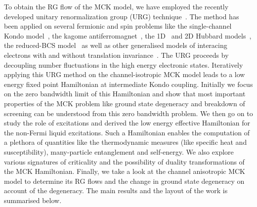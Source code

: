 \documentclass[reprint,prb,superscriptaddress]{revtex4-2}
\begin{document}
To obtain the RG flow of the MCK model, we have employed the recently developed unitary renormalization group (URG) technique~\cite{anirbanurg1,anirbanurg2}.
The method has been applied on several fermionic and spin problems like the single-channel Kondo model~\cite{kondo_urg}, the kagome antiferromagnet~\cite{santanukagome}, the 1D~\cite{1dhubjhep} and 2D Hubbard models~\cite{anirbanmott1,anirbanmott2}, the reduced-BCS model~\cite{siddharthacpi} as well as other generalised models of interacing electrons with and without translation invariance~\cite{anirbanurg2}.
The URG proceeds by decoupling number fluctuations in the high energy electronic states.
Iteratively applying this URG method on the channel-isotropic MCK model leads to a low energy fixed point Hamiltonian at intermediate Kondo coupling.
Initially we focus on the zero bandwidth limit of this Hamiltonian and show that most important properties of the MCK problem like ground state degeneracy and breakdown of screening can be understood from this zero bandwidth problem.
We then go on to study the role of excitations and derived the low energy effective Hamiltonian for the non-Fermi liquid excitations.
Such a Hamiltonian enables the computation of a plethora of quantities like the thermodynamic measures (like specific heat and susceptibility), many-particle entanglement and self-energy. 
We also explore various signatures of criticality and the possibility of duality transformations of the MCK Hamiltonian.
Finally, we take a look at the channel anisotropic MCK model to determine its RG flows and the change in ground state degeneracy on account of the degeneracy. The main results and the layout of the work is summarised below.
\end{document}
